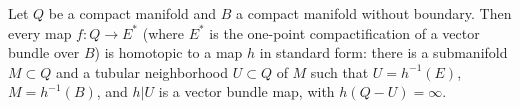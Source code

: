 Let $Q$ be a compact manifold and $B$ a compact manifold without boundary. Then every map $f: Q \to E^*$ (where $E^*$ is the one-point compactification of a vector bundle over $B$) is homotopic to a map $h$ in standard form: there is a submanifold $M \subset Q$ and a tubular neighborhood $U \subset Q$ of $M$ such that $U = h^{-1}(E)$, $M = h^{-1}(B)$, and $h|U$ is a vector bundle map, with $h(Q - U) = \infty$.
